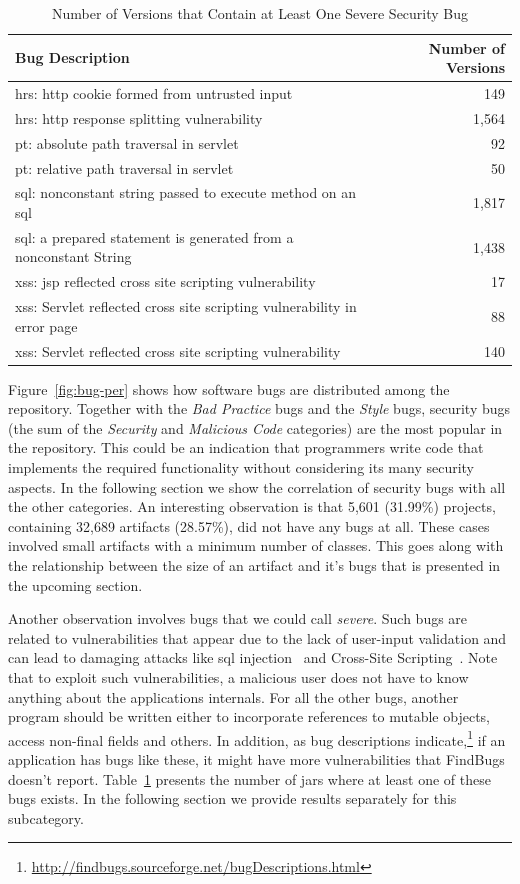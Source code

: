\documentclass[conference]{IEEEtran}
\begin{document}
\begin{table}
\centering
\caption{Number of Versions that Contain at Least One Severe Security Bug}
\label{tbl:sev}
\leavevmode
	\begin{tabular}{l r}
	\hline
	Bug Description & Number of Versions\\
 	\hline
	{\sc hrs}: {\sc http} cookie formed from untrusted input & 149\\
	{\sc hrs}: {\sc http} response splitting vulnerability & 1,564\\
	{\sc pt}: absolute path traversal in servlet  & 92\\
	{\sc pt}: relative path traversal in servlet & 50\\
	{\sc sql}: nonconstant string passed to execute method on an {\sc sql} & 1,817\\
	{\sc sql}: a prepared statement is generated from a nonconstant String & 1,438\\
	{\sc xss}: {\sc jsp} reflected cross site scripting vulnerability & 17\\
	{\sc xss}: Servlet reflected cross site scripting vulnerability in error page & 88\\
	{\sc xss}: Servlet reflected cross site scripting vulnerability & 140\\
	\hline
	\end{tabular}
\end{table}

Figure~\ref{fig:bug-per} shows how software bugs are distributed among the
repository. Together with the {\it Bad Practice} bugs and the {\it Style} bugs,
security bugs (the sum of the {\it Security} and {\it Malicious Code}
categories) are the most popular in the repository. This could be an indication
that programmers write code that implements the required functionality without considering
its many security aspects. In the following section we
show the correlation of security bugs with all the other categories. An interesting observation is
that 5,601 (31.99\%) projects, containing 32,689 artifacts (28.57\%), did not
have any bugs at all. These cases involved small artifacts with a minimum number of classes.
This goes along with the relationship between the size of an artifact and it's
bugs that is presented in the upcoming section.

Another observation involves bugs that we could call {\it
severe}. Such bugs are related to vulnerabilities that appear due to the lack of user-input
validation and can lead to damaging attacks like {\sc sql} injection~\cite{RL12} and
Cross-Site Scripting~\cite{WS08}. Note that to exploit such vulnerabilities, a malicious user does
not have to know anything about the applications internals. For all the other
bugs, another program should be written either to incorporate references to
mutable objects, access non-final fields and others. In addition, as
bug descriptions indicate,\footnote{\url{http://findbugs.sourceforge.net/bugDescriptions.html}}
if an application has bugs like these, it might have more vulnerabilities that FindBugs doesn't
report. Table~\ref{tbl:sev} presents the number of {\sc jar}s where at least one of these
bugs exists. In the following section we provide results separately for this
subcategory.
\end{document}
